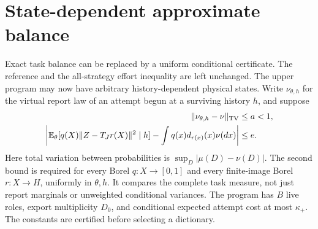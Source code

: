 \section{State-dependent approximate balance}
\label{sec:approx}
Exact task balance can be replaced by a uniform conditional certificate. The reference and the all-strategy effort inequality are left unchanged. The upper program may now have arbitrary history-dependent physical states. Write $\nu_{\theta,h}$ for the virtual report law of an attempt begun at a surviving history $h$, and suppose
\begin{align}
 \|\nu_{\theta,h}-\nu\|_{\mathrm{TV}}&\le a<1,\label{eq:approx-mass}\\
 \left|\mathbb E_\theta[q(X)\|Z-T_Jr(X)\|^2\mid h]
       -\int q(x)d_{r(x)}(x)\nu(dx)\right|&\le e.\label{eq:approx-task}
\end{align}
Here total variation between probabilities is $\sup_D|\mu(D)-\nu(D)|$. The second bound is required for every Borel $q:X\to[0,1]$ and every finite-image Borel $r:X\to H$, uniformly in $\theta,h$. It compares the complete task measure, not just report marginals or unweighted conditional variances. The program has $B$ live roles, export multiplicity $D_0$, and conditional expected attempt cost at most $\kappa_+$. The constants are certified before selecting a dictionary.

